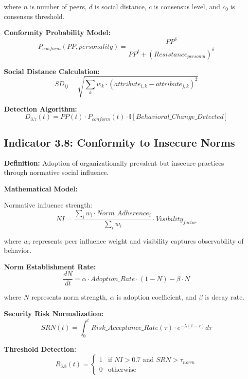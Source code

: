 \documentclass[11pt,a4paper]{article}
\begin{document}
where $n$ is number of peers, $d$ is social distance, $c$ is consensus level, and $c_0$ is consensus threshold.

\textbf{Conformity Probability Model:}
\begin{equation}
P_{conform}(PP, personality) = \frac{PP^{\delta}}{PP^{\delta} + (Resistance_{personal})^{\delta}}
\end{equation}

\textbf{Social Distance Calculation:}
\begin{equation}
SD_{ij} = \sqrt{\sum_{k} w_k \cdot (attribute_{i,k} - attribute_{j,k})^2}
\end{equation}

\textbf{Detection Algorithm:}
\begin{equation}
D_{3.7}(t) = PP(t) \cdot P_{conform}(t) \cdot \mathbb{I}[Behavioral\_Change\_Detected]
\end{equation}

\subsection{Indicator 3.8: Conformity to Insecure Norms}

\textbf{Definition:} Adoption of organizationally prevalent but insecure practices through normative social influence.

\textbf{Mathematical Model:}

Normative influence strength:
\begin{equation}
NI = \frac{\sum_{i} w_i \cdot Norm\_Adherence_i}{\sum_{i} w_i} \cdot Visibility_{factor}
\end{equation}

where $w_i$ represents peer influence weight and visibility captures observability of behavior.

\textbf{Norm Establishment Rate:}
\begin{equation}
\frac{dN}{dt} = \alpha \cdot Adoption\_Rate \cdot (1 - N) - \beta \cdot N
\end{equation}

where $N$ represents norm strength, $\alpha$ is adoption coefficient, and $\beta$ is decay rate.

\textbf{Security Risk Normalization:}
\begin{equation}
SRN(t) = \int_0^t Risk\_Acceptance\_Rate(\tau) \cdot e^{-\lambda(t-\tau)} d\tau
\end{equation}

\textbf{Threshold Detection:}
\begin{equation}
R_{3.8}(t) = \begin{cases}
1 & \text{if } NI > 0.7 \text{ and } SRN > \tau_{norm} \\
0 & \text{otherwise}
\end{cases}
\end{equation}
\end{document}
